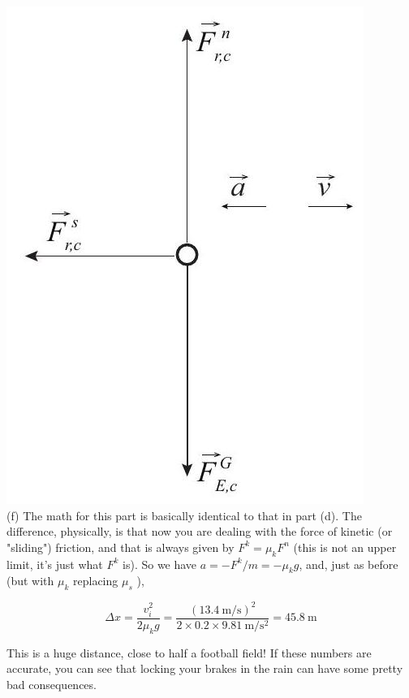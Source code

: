\documentclass[10pt]{article}
\begin{document}
\includegraphics[max width=\textwidth, center]{2024_09_14_9969b06773f10b6936e8g-150}\\
(f) The math for this part is basically identical to that in part (d). The difference, physically, is that now you are dealing with the force of kinetic (or "sliding") friction, and that is always given by $F^{k}=\mu_{k} F^{n}$ (this is not an upper limit, it's just what $F^{k}$ is). So we have $a=-F^{k} / m=-\mu_{k} g$, and, just as before (but with $\mu_{k}$ replacing $\mu_{s}$ ),

$$
\Delta x=\frac{v_{i}^{2}}{2 \mu_{k} g}=\frac{(13.4 \mathrm{~m} / \mathrm{s})^{2}}{2 \times 0.2 \times 9.81 \mathrm{~m} / \mathrm{s}^{2}}=45.8 \mathrm{~m}
$$

This is a huge distance, close to half a football field! If these numbers are accurate, you can see that locking your brakes in the rain can have some pretty bad consequences.
\end{document}
